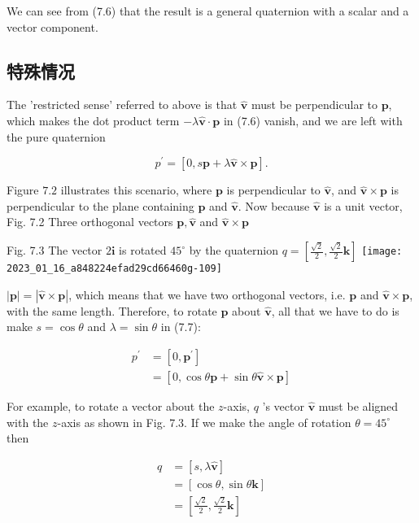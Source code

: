 We can see from (7.6) that the result is a general quaternion with a scalar and a vector component.

\subsection{特殊情况}
The 'restricted sense' referred to above is that $\hat{\mathbf{v}}$ must be perpendicular to $\mathbf{p}$, which makes the dot product term $-\lambda \hat{\mathbf{v}} \cdot \mathbf{p}$ in (7.6) vanish, and we are left with the pure quaternion

$$
p^{\prime}=[0, s \mathbf{p}+\lambda \hat{\mathbf{v}} \times \mathbf{p}] .
$$

Figure $7.2$ illustrates this scenario, where $\mathbf{p}$ is perpendicular to $\hat{\mathbf{v}}$, and $\hat{\mathbf{v}} \times \mathbf{p}$ is perpendicular to the plane containing $\mathbf{p}$ and $\hat{\mathbf{v}}$. Now because $\hat{\mathbf{v}}$ is a unit vector, Fig. 7.2 Three orthogonal vectors $\mathbf{p}, \hat{\mathbf{v}}$ and $\hat{\mathbf{v}} \times \mathbf{p}$

Fig. 7.3 The vector $2 \mathbf{i}$ is rotated $45^{\circ}$ by the quaternion $q=\left[\frac{\sqrt{2}}{2}, \frac{\sqrt{2}}{2} \mathbf{k}\right]$
\texttt{[image: 2023\_01\_16\_a848224efad29cd66460g-109]}

$|\mathbf{p}|=|\hat{\mathbf{v}} \times \mathbf{p}|$, which means that we have two orthogonal vectors, i.e. $\mathbf{p}$ and $\hat{\mathbf{v}} \times \mathbf{p}$, with the same length. Therefore, to rotate $\mathbf{p}$ about $\hat{\mathbf{v}}$, all that we have to do is make $s=\cos \theta$ and $\lambda=\sin \theta$ in (7.7):

$$
\begin{aligned}
p^{\prime} & =\left[0, \mathbf{p}^{\prime}\right] \\
& =[0, \cos \theta \mathbf{p}+\sin \theta \hat{\mathbf{v}} \times \mathbf{p}]
\end{aligned}
$$

For example, to rotate a vector about the $z$-axis, $q$ 's vector $\hat{\mathbf{v}}$ must be aligned with the $z$-axis as shown in Fig. 7.3. If we make the angle of rotation $\theta=45^{\circ}$ then

$$
\begin{aligned}
q & =[s, \lambda \hat{\mathbf{v}}] \\
& =[\cos \theta, \sin \theta \mathbf{k}] \\
& =\left[\frac{\sqrt{2}}{2}, \frac{\sqrt{2}}{2} \mathbf{k}\right]
\end{aligned}
$$

